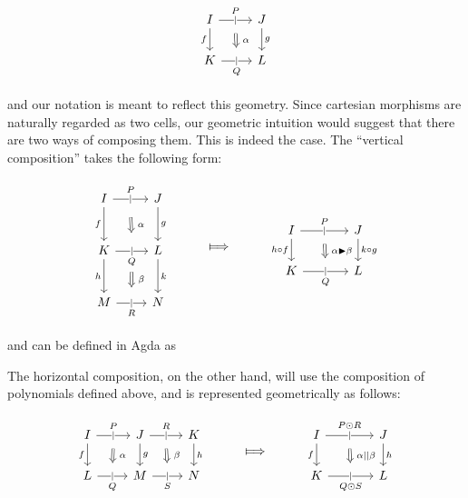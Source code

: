 \documentclass{article}
\newcommand{\snippet}[1]{\ExecuteMetaData[latex/opetopes.tex]{#1}}
\newcommand{\polyarrowup}[2]{\arrow{r}[name=#1,inner sep=5pt,below]{}[description, inner sep=0pt]{|}[inner sep=5pt]{#2}}
\newcommand{\polyarrowdn}[2]{\arrow{r}[name=#1,inner sep=5pt]{}[description, inner sep=0pt]{|}[inner sep=5pt, below]{#2}}
\begin{document}
\[
\begin{tikzcd}
  I \polyarrowup{U}{P} \ar[d, "f"'] & J \ar[d, "g"] \\
  K \polyarrowdn{D}{Q} & L
  \arrow[Rightarrow, from=U, to=D]{}[inner sep=5pt]{\alpha}
\end{tikzcd}
\]

\noindent and our notation is meant to reflect this geometry.  Since
cartesian morphisms are naturally regarded as two cells, our geometric
intuition would suggest that there are two ways of composing them.
This is indeed the case.  The ``vertical composition'' takes the following
form:

\[
\begin{tikzcd}[row sep=large]
  I \arrow{r}[name=U,inner sep=7pt,below]{}[description, inner sep=0pt]{|}[inner sep=5pt]{P} \ar[d, "f"'] & J \ar[d, "g"] \\
  K \arrow{r}[name=D,inner sep=7pt]{}[name=A,inner sep=8pt,below]{}[description, inner sep=0pt]{|}[inner sep=5pt, below]{Q} \ar[d, "h"']
  & L \arrow[Rightarrow, from=U, to=D]{}[inner sep=5pt]{\alpha} \ar[d, "k"] \\
  M \arrow{r}[name=B,inner sep=6pt]{}[description, inner sep=0pt]{|}[inner sep=5pt, below]{R}
  & N \arrow[Rightarrow, from=A, to=B]{}[inner sep=5pt]{\beta}
\end{tikzcd} \hspace{1cm} \Longmapsto \hspace{1cm}
\begin{tikzcd}[column sep=large]
  I \polyarrowup{U}{P} \ar[d, "h \circ f"'] & J \ar[d, "k \circ g"] \\
  K \polyarrowdn{D}{Q} & L
  \arrow[Rightarrow, from=U, to=D]{}[inner sep=5pt]{\alpha \blacktriangleright \beta}
\end{tikzcd}
\]

\noindent and can be defined in Agda as

\snippet{vertcomp}

The horizontal composition, on the other hand, will use the
composition of polynomials defined above, and is represented
geometrically as follows:

\[
\begin{tikzcd}
  I \polyarrowup{U}{P} \ar[d, "f"'] & J \polyarrowup{X}{R} \ar[d, "g"] & K \ar[d, "h"] \\
  L \polyarrowdn{D}{Q} & M \polyarrowdn{Y}{S} & N 
  \arrow[Rightarrow, from=U, to=D]{}[inner sep=5pt]{\alpha}
  \arrow[Rightarrow, from=X, to=Y]{}[pos=1.2,inner sep=5pt]{\beta}
\end{tikzcd} \hspace{1cm} \Longmapsto \hspace{1cm}
\begin{tikzcd}[column sep=large]
  I \polyarrowup{U}{P \odot R} \ar[d, "f"'] & J \ar[d, "h"] \\
  K \polyarrowdn{D}{Q \odot S} & L
  \arrow[Rightarrow, from=U, to=D]{}[inner sep=5pt]{\alpha || \beta}
\end{tikzcd}
\]
\end{document}

